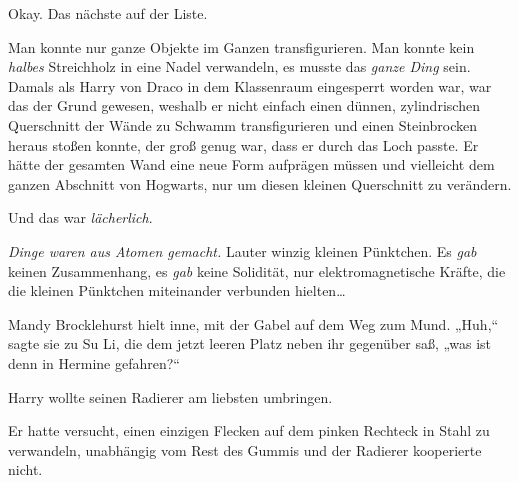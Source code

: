 Okay. Das nächste auf der Liste.

Man konnte nur ganze Objekte im Ganzen transfigurieren. Man konnte kein \emph{halbes} Streichholz in eine Nadel verwandeln, es musste das \emph{ganze Ding} sein. Damals als Harry von Draco in dem Klassenraum eingesperrt worden war, war das der Grund gewesen, weshalb er nicht einfach einen dünnen, zylindrischen Querschnitt der Wände zu Schwamm transfigurieren und einen Steinbrocken heraus stoßen konnte, der groß genug war, dass er durch das Loch passte. Er hätte der gesamten Wand eine neue Form aufprägen müssen und vielleicht dem ganzen Abschnitt von Hogwarts, nur um diesen kleinen Querschnitt zu verändern.

Und das war \emph{lächerlich}.

\emph{Dinge waren aus Atomen gemacht.} Lauter winzig kleinen Pünktchen. Es \emph{gab} keinen Zusammenhang, es \emph{gab} keine Solidität, nur elektromagnetische Kräfte, die die kleinen Pünktchen miteinander verbunden hielten…

\later

Mandy Brocklehurst hielt inne, mit der Gabel auf dem Weg zum Mund. „Huh,“ sagte sie zu Su Li, die dem jetzt leeren Platz neben ihr gegenüber saß, „was ist denn in Hermine gefahren?“

\later

Harry wollte seinen Radierer am liebsten umbringen.

Er hatte versucht, einen einzigen Flecken auf dem pinken Rechteck in Stahl zu verwandeln, unabhängig vom Rest des Gummis und der Radierer kooperierte nicht.

